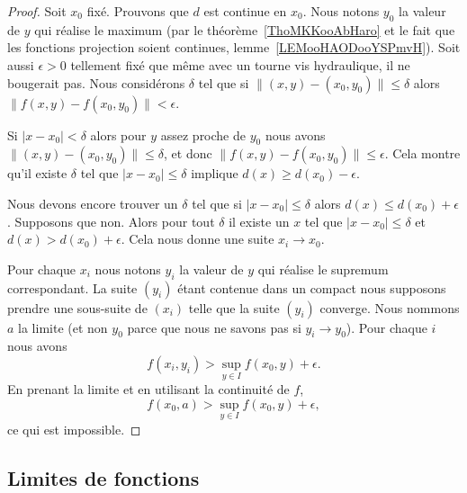 \begin{proof}
    Soit \( x_0\) fixé. Prouvons que \( d\) est continue en \( x_0\). Nous notons \( y_0\) la valeur de \( y\) qui réalise le maximum (par le théorème~\ref{ThoMKKooAbHaro} et le fait que les fonctions projection soient continues, lemme~\ref{LEMooHAODooYSPmvH}). Soit aussi \( \epsilon>0\) tellement fixé que même avec un tourne vis hydraulique, il ne bougerait pas. Nous considérons \( \delta\) tel que si \( \| (x,y)-(x_0,y_0) \|\leq \delta\) alors \( \| f(x,y)-f(x_0,y_0) \|<\epsilon\).

    Si \( | x-x_0 |<\delta\) alors pour \( y\) assez proche de \( y_0\) nous avons \( \| (x,y)-(x_0,y_0) \|\leq \delta\), et donc \( \| f(x,y)-f(x_0,y_0) \|\leq \epsilon \). Cela montre qu'il existe \( \delta\) tel que \( | x-x_0 |\leq \delta\) implique \( d(x)\geq d(x_0)-\epsilon\).

    Nous devons encore trouver un \( \delta\) tel que si \( | x-x_0 |\leq \delta\) alors \( d(x)\leq d(x_0)+\epsilon\). Supposons que non. Alors pour tout \( \delta\) il existe un \( x\) tel que \( | x-x_0 |\leq \delta\) et \( d(x)> d(x_0)+\epsilon\). Cela nous donne une suite \( x_i\to x_0\).

    Pour chaque \( x_i\) nous notons \( y_i\) la valeur de \( y\) qui réalise le supremum correspondant. La suite \( (y_i)\) étant contenue dans un compact nous supposons prendre une sous-suite de \( (x_i)\) telle que la suite \( (y_i)\) converge. Nous nommons \( a\) la limite (et non \( y_0\) parce que nous ne savons pas si \( y_i\to y_0\)). Pour chaque \( i\) nous avons
    \begin{equation}
        f(x_i,y_i)>\sup_{y\in I}f(x_0,y)+\epsilon.
    \end{equation}
    En prenant la limite et en utilisant la continuité de \( f\),
    \begin{equation}
        f(x_0,a)>\sup_{y\in I} f(x_0,y)+\epsilon,
    \end{equation}
    ce qui est impossible.
\end{proof}

\subsection{Limites de fonctions}

